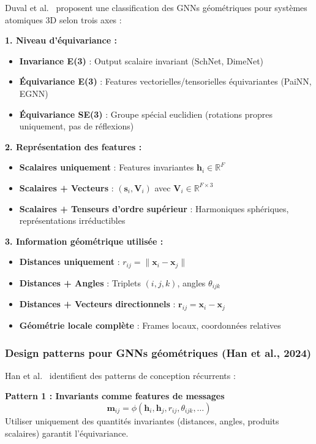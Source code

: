 Duval et al.~\cite{Duval2024} proposent une classification des GNNs géométriques pour systèmes atomiques 3D selon trois axes :

\textbf{1. Niveau d'équivariance :}
\begin{itemize}
    \item \textbf{Invariance E(3)} : Output scalaire invariant (SchNet, DimeNet)
    \item \textbf{Équivariance E(3)} : Features vectorielles/tensorielles équivariantes (PaiNN, EGNN)
    \item \textbf{Équivariance SE(3)} : Groupe spécial euclidien (rotations propres uniquement, pas de réflexions)
\end{itemize}

\textbf{2. Représentation des features :}
\begin{itemize}
    \item \textbf{Scalaires uniquement} : Features invariantes $\mathbf{h}_i \in \mathbb{R}^F$
    \item \textbf{Scalaires + Vecteurs} : $(\mathbf{s}_i, \mathbf{V}_i)$ avec $\mathbf{V}_i \in \mathbb{R}^{F \times 3}$
    \item \textbf{Scalaires + Tenseurs d'ordre supérieur} : Harmoniques sphériques, représentations irréductibles
\end{itemize}

\textbf{3. Information géométrique utilisée :}
\begin{itemize}
    \item \textbf{Distances uniquement} : $r_{ij} = \|\mathbf{x}_i - \mathbf{x}_j\|$
    \item \textbf{Distances + Angles} : Triplets $(i,j,k)$, angles $\theta_{ijk}$
    \item \textbf{Distances + Vecteurs directionnels} : $\mathbf{r}_{ij} = \mathbf{x}_i - \mathbf{x}_j$
    \item \textbf{Géométrie locale complète} : Frames locaux, coordonnées relatives
\end{itemize}

\subsubsection{Design patterns pour GNNs géométriques (Han et al., 2024)}

Han et al.~\cite{Han2024} identifient des patterns de conception récurrents :

\textbf{Pattern 1 : Invariants comme features de messages}
\[
\mathbf{m}_{ij} = \phi(\mathbf{h}_i, \mathbf{h}_j, r_{ij}, \theta_{ijk}, \ldots)
\]
Utiliser uniquement des quantités invariantes (distances, angles, produits scalaires) garantit l'équivariance.

